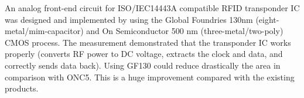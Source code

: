 An analog front-end circuit for ISO/IEC14443A compatible RFID transponder IC was designed and implemented by using the Global Foundries 130nm (eight-metal/mim-capacitor) and On Semiconductor 500 nm (three-metal/two-poly) CMOS process. The measurement demonstrated that the transponder IC works properly (converts RF power to DC voltage, extracts the clock and data, and correctly sends data back). Using GF130 could reduce drastically the area in comparison with ONC5. This is a huge improvement compared with the existing products.

